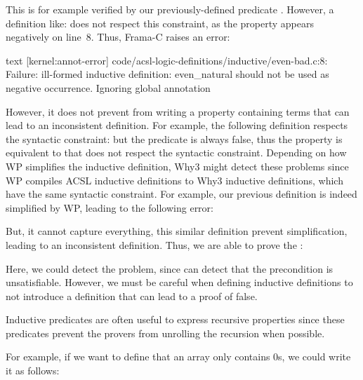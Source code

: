 This is for example verified by our previously-defined predicate
. However, a definition like:
does not respect this constraint, as the property 
appears negatively on line~8. Thus, Frama-C raises an error:


\begin{CodeBlock}{text}
[kernel:annot-error] code/acsl-logic-definitions/inductive/even-bad.c:8: Failure:
  ill-formed inductive definition: even_natural should not be used as
  negative occurrence. Ignoring global annotation
\end{CodeBlock}


However, it does not prevent from writing a property containing terms that can
lead to an inconsistent definition. For example, the following definition
respects the syntactic constraint:
but the predicate 
is always false, thus the property is equivalent to
 that does not respect the syntactic
constraint. Depending on how WP simplifies the inductive definition, Why3 might
detect these problems since WP compiles ACSL inductive definitions to Why3
inductive definitions, which have the same syntactic constraint. For example,
our previous definition is indeed simplified by WP, leading to the following
error:


But, it cannot capture everything, this similar definition prevent simplification,
leading to an inconsistent definition. Thus, we are able to prove the
:






Here, we could detect the problem, since  can detect
that the precondition is unsatisfiable. However, we must be careful when defining
inductive definitions to not introduce a definition that can lead to a proof
of false.





Inductive predicates are often useful to express recursive properties since
these predicates prevent the provers from unrolling the recursion when possible.

For example, if we want to define that an array only contains 0s, we could
write it as follows:


